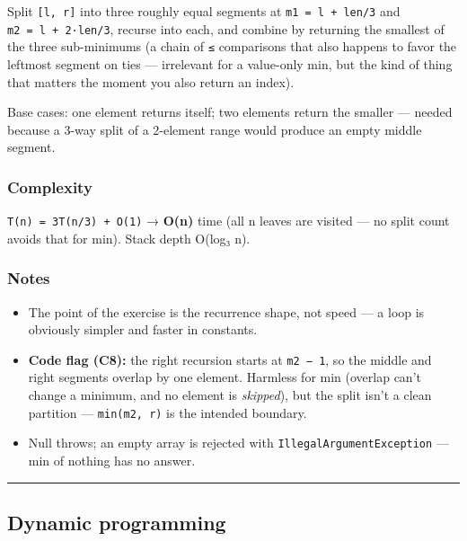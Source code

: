 \documentclass[
  10pt,
  letterpaper,
  onecolumn]{article}
\providecommand{\tightlist}{%
  \setlength{\itemsep}{0pt}\setlength{\parskip}{0pt}}
\begin{document}
Split \texttt{{[}l,\ r{]}} into three roughly equal segments at
\texttt{m1\ =\ l\ +\ len/3} and \texttt{m2\ =\ l\ +\ 2·len/3}, recurse
into each, and combine by returning the smallest of the three
sub-minimums (a chain of \texttt{≤} comparisons that also happens to
favor the leftmost segment on ties --- irrelevant for a value-only min,
but the kind of thing that matters the moment you also return an index).

Base cases: one element returns itself; two elements return the smaller
--- needed because a 3-way split of a 2-element range would produce an
empty middle segment.

\hypertarget{complexity-5}{%
\subsubsection{Complexity}\label{complexity-5}}

\texttt{T(n)\ =\ 3T(n/3)\ +\ O(1)} → \textbf{O(n)} time (all n leaves
are visited --- no split count avoids that for min). Stack depth O(log₃
n).

\hypertarget{notes-4}{%
\subsubsection{Notes}\label{notes-4}}

\begin{itemize}
\tightlist
\item
  The point of the exercise is the recurrence shape, not speed --- a
  loop is obviously simpler and faster in constants.
\item
  \textbf{Code flag (C8):} the right recursion starts at
  \texttt{m2\ −\ 1}, so the middle and right segments overlap by one
  element. Harmless for min (overlap can't change a minimum, and no
  element is \emph{skipped}), but the split isn't a clean partition ---
  \texttt{min(m2,\ r)} is the intended boundary.
\item
  Null throws; an empty array is rejected with
  \texttt{IllegalArgumentException} --- min of nothing has no answer.
\end{itemize}

\begin{center}\rule{0.5\linewidth}{0.5pt}\end{center}

\hypertarget{dynamic-programming}{%
\subsection{Dynamic programming}\label{dynamic-programming}}
\end{document}
